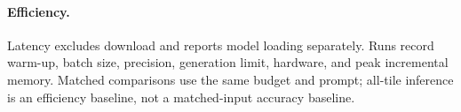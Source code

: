 \paragraph{Efficiency.}
Latency excludes download and reports model loading separately.  Runs record
warm-up, batch size, precision, generation limit, hardware, and peak incremental
memory.  Matched comparisons use the same budget and prompt; all-tile inference
is an efficiency baseline, not a matched-input accuracy baseline.
